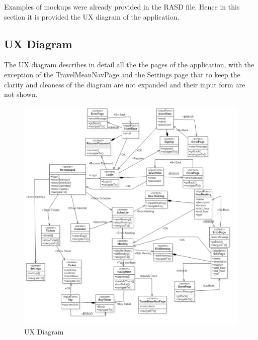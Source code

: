 Examples of mockups were already provided in the RASD file. Hence in this section it is provided the UX diagram of the application.

\subsection{UX Diagram}
The UX diagram describes in detail all the the pages of the application, with the exception of the TravelMeanNavPage and the Settings page that to keep the clarity and cleaness of the diagram are not expanded and their input form are not shown.

\begin{figure}[!htb]
\centering
\includegraphics[scale=0.4]{Images/ux.png}
\caption{UX Diagram}\label{fig:1}
\end{figure}
